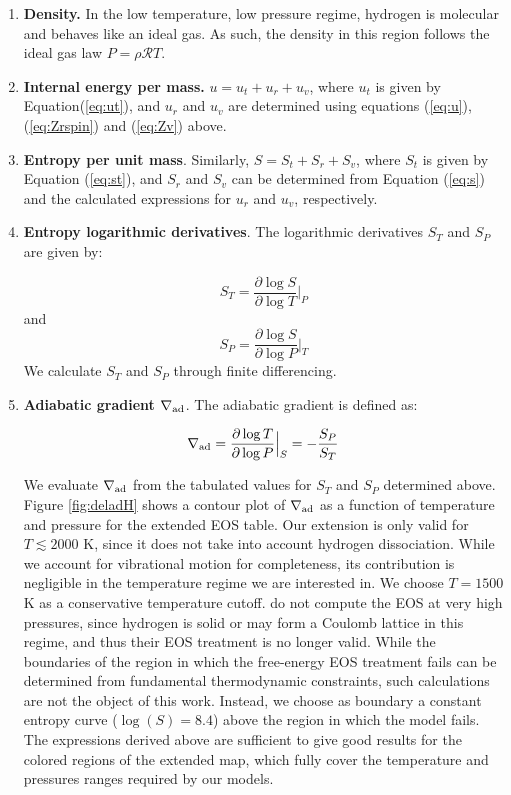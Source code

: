 \documentclass[apj]{emulateapj}
\newcommand{\delad}{\nabla_{\rm ad}}
\begin{document}
\begin{enumerate}

\item{\textbf{Density.}} In the low temperature, low pressure regime, hydrogen is molecular and behaves like an ideal gas. As such, the density in this region follows the ideal gas law $P=\rho \mathcal{R} T$.
\item{\textbf{Internal energy per mass.}} $u=u_t+u_r+u_v$, where $u_t$ is given by Equation(\ref{eq:ut}), and $u_r$ and $u_v$ are determined using equations (\ref{eq:u}), (\ref{eq:Zrspin}) and (\ref{eq:Zv}) above.
\item{\textbf{Entropy per unit mass}}. Similarly, $S=S_t+S_r+S_v$, where $S_t$ is given by Equation (\ref{eq:st}), and $S_r$ and $S_v$ can be determined from Equation (\ref{eq:s}) and the calculated expressions for $u_r$ and $u_v$, respectively.
\item{\textbf{Entropy logarithmic derivatives}}. The logarithmic derivatives $S_T$ and $S_P$ are given by:

\begin{equation}
\label{eq:sT}
S_T=\frac{\partial \log{S}}{\partial \log{T}} \Big |_P
\end{equation}
and
\begin{equation}
\label{eq:sP}
S_P=\frac{\partial \log{S}}{\partial \log{P}} \Big |_T
\end{equation}
We calculate $S_T$ and $S_P$ through finite differencing. 

\item{\textbf{Adiabatic gradient $\delad$}}. The adiabatic gradient is defined as:

\begin{equation}
\label{eq:deladSP}
\delad=\frac{\partial \log{T}}{\partial \log{P}} \Big |_S = -\frac{S_P}{S_T}
\end{equation}

We evaluate $\delad$ from the tabulated values for $S_T$ and $S_P$ determined above. Figure \ref{fig:deladH} shows a contour plot of $\delad$ as a function of temperature and pressure for the extended EOS table. Our extension is only valid for $T \lesssim 2000$ K, since it does not take into account hydrogen dissociation. While we account for vibrational motion for completeness, its contribution is negligible in the temperature regime we are interested in. We choose $T=1500$ K as a conservative temperature cutoff. \citet{saumon95} do not compute the EOS at very high pressures, since hydrogen is solid or may form a Coulomb lattice in this regime, and thus their EOS treatment is no longer valid. While the boundaries of the region in which the free-energy EOS treatment fails can be determined from fundamental thermodynamic constraints, such calculations are not the object of this work. Instead, we choose as boundary a constant entropy curve ($\log(S)=8.4$) above the region in which the \citet{saumon95} model fails. The expressions derived above are sufficient to give good results for the colored regions of the extended map, which fully cover the temperature and pressures ranges required by our models.


\end{enumerate}
\end{document}

